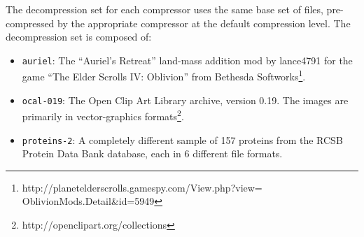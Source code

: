 The decompression set for each compressor uses the same base set of files, pre-compressed by the appropriate compressor at the default compression level.  The decompression set is composed of:
\begin{itemize}
\item {\tt auriel}: The ``Auriel's Retreat'' land-mass addition mod by lance4791 for the game ``The Elder Scrolls IV: Oblivion'' from Bethesda Softworks\footnote{http://planetelderscrolls.gamespy.com/View.php?view=\\ \hspace*{150 pt}OblivionMods.Detail\&id=5949}.




\item {\tt ocal-019}: The Open Clip Art Library archive, version 0.19. The images are primarily in vector-graphics formats\footnote{http://openclipart.org/collections}.


\item {\tt proteins-2}: A completely different sample of 157 proteins from the RCSB Protein Data Bank database, each in 6 different file formats.


\end{itemize}


